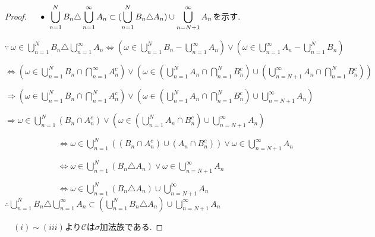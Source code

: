 \documentclass{jsarticle}
\begin{document}
\begin{proof}
$\displaystyle \\ \quad \bullet \ \displaystyle\bigcup_{n=1}^{N} B_{n} \triangle \displaystyle\bigcup_{n=1}^{\infty} A_{n} \subset (\displaystyle\bigcup_{n=1}^{N} B_{n} \triangle A_{n}) \cup \displaystyle\bigcup_{n=N+1}^{\infty} A_{n}$を示す. \par
$\quad \qquad$ $\because \ \omega \in \displaystyle\bigcup_{n=1}^{N} B_{n} \triangle \displaystyle\bigcup_{n=1}^{\infty} A_{n} \Leftrightarrow (\omega \in \displaystyle\bigcup_{n=1}^{N} B_{n} - \displaystyle\bigcup_{n=1}^{\infty} A_{n}) \lor  (\omega \in \displaystyle\bigcup_{n=1}^{\infty} A_{n} - \displaystyle\bigcup_{n=1}^{N} B_{n})$ \par 
$\qquad \qquad \qquad$
$ \Leftrightarrow (\omega \in \displaystyle\bigcup_{n=1}^{N} B_{n} \cap \displaystyle\bigcap_{n=1}^{\infty} A_{n}^{c}) \lor 
 (\omega \in ( \displaystyle\bigcup_{n=1}^{N} A_{n} \cap \displaystyle\bigcap_{n=1}^{N} B_{n}^{c}) \cup (\displaystyle\bigcup_{n=N+1}^{\infty} A_{n} \cap \displaystyle\bigcap_{n=1}^{N} B_{n}^{c}) ) $\par 
$\qquad \qquad \qquad$
$\Rightarrow (\omega \in \displaystyle\bigcup_{n=1}^{N} B_{n} \cap \displaystyle\bigcap_{n=1}^{N} A_{n}^{c}) \lor (\omega \in ( \displaystyle\bigcup_{n=1}^{N} A_{n} \cap \displaystyle\bigcap_{n=1}^{N} B_{n}^{c}) \cup \displaystyle\bigcup_{n=N+1}^{\infty} A_{n} )$\par 
$\qquad \qquad \qquad$
$\Rightarrow \omega \in \displaystyle\bigcup_{n=1}^{N} (B_{n} \cap  A_{n}^{c}) \lor (\omega \in ( \displaystyle\bigcup_{n=1}^{N} A_{n} \cap B_{n}^{c}) \cup \displaystyle\bigcup_{n=N+1}^{\infty} A_{n} )$
\par 
$\qquad \qquad \qquad$
$\Leftrightarrow \omega \in \displaystyle\bigcup_{n=1}^{N} ( (B_{n} \cap  A_{n}^{c}) \cup (A_{n} \cap  B_{n}^{c}) ) \lor \omega \in \displaystyle\bigcup_{n=N+1}^{\infty} A_{n}$
\par 
$\qquad \qquad \qquad$
$\Leftrightarrow  \omega \in \displaystyle\bigcup_{n=1}^{N} ( B_{n} \triangle A_{n}) \lor \omega \in \displaystyle\bigcup_{n=N+1}^{\infty} A_{n}$
\par 
$\qquad \qquad \qquad$
$\Leftrightarrow \omega \in \displaystyle\bigcup_{n=1}^{N} ( B_{n} \triangle A_{n}) \cup \displaystyle\bigcup_{n=N+1}^{\infty} A_{n}$
$\qquad \quad$ $\therefore \displaystyle\bigcup_{n=1}^{N} B_{n} \triangle \displaystyle\bigcup_{n=1}^{\infty} A_{n} \subset (\displaystyle\bigcup_{n=1}^{N} B_{n} \triangle A_{n}) \cup \displaystyle\bigcup_{n=N+1}^{\infty} A_{n}$ \par
$\quad$$(i) \sim (iii)$より$\mathcal{C}$は$\sigma$加法族である.



\end{proof}
\end{document}
